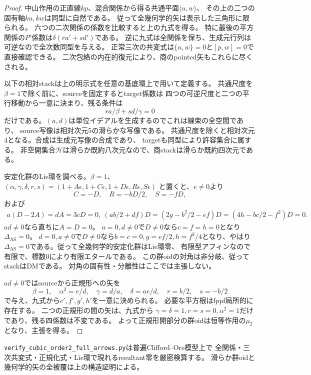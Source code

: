 \begin{proof}
中山作用の正直線$kp$、混合関係から得る共通平面$\langle u,w\rangle$、
その上の二つの固有軸$ku,kw$は同型に自然である。
従って全幾何学的矢は表示した三角形に限られる。
六つの二次関係の係数を比較すると上の九式を得る。
特に最後の平方関係の$P'$係数は$\delta(ra'+sd')$である。
逆に九式は全関係を保ち、生成元行列は可逆なので全次数同型を与える。
正常三次の共変式は$\{u,w\}=0$と$[p,w]=0$で直接確認できる。
二次包絡の内在的復元により、商のpointed矢もこれらに尽くされる。

以下の相対stackは上の明示式を任意の基底環上で用いて定義する。
共通尺度を$\beta=1$で除く前に、sourceを固定するとtarget係数は
四つの可逆尺度と二つの平行移動から一意に決まり、残る条件は
\[
 ra/\beta+sd/\gamma=0
\]
だけである。$(a,d)$は単位イデアルを生成するのでこれは線束の全空間であり、
source写像は相対次元5の滑らかな写像である。
共通尺度を除くと相対次元4となる。合成は生成元写像の合成であり、
targetも同型により許容集合に属する。
非空開集合$\mathcal H$は滑らか既約八次元なので、商stackは滑らか既約四次元である。

安定化群のLie環を調べる。$\beta=1$、
$(\alpha,\gamma,\delta,r,s)=(1+A\epsilon,1+C\epsilon,1+D\epsilon,R\epsilon,S\epsilon)$
と置くと、$e\ne0$より
\[
 C=-D,\quad R=-bD/2,\quad S=-fD,
\]
および
\begin{gather*}
 a(D-2A)=dA=3cD=0,\
 (ab/2+df)D=(2g-b^2/2-ef)D=(4h-bc/2-f^2)D=0.
\end{gather*}
$ad\ne0$なら直ちに$A=D=0$。
$a=0,d\ne0$で$D\ne0$なら$c=f=h=0$となり$\Delta_{\mathrm{AS}}=0$。
$d=0,a\ne0$で$D\ne0$なら$b=c=0,g=ef/2,h=f^2/4$となり、やはり
$\Delta_{\mathrm{AS}}=0$である。従って全幾何学的安定化群はLie環零、
有限型アフィンなので有限で、標数0により有限エタールである。
この群oidの対角は非分岐、従ってstackはDMである。
対角の固有性・分離性はここでは主張しない。

$ad\ne0$ではsourceから正規形への矢を
\[
 \beta=1,\quad\alpha^2=e/d,\quad\gamma=d/a,\quad
 \delta=ae/d,\quad r=b/2,\quad s=-b/2
\]
で与え、九式から$c',f',g',h'$を一意に決められる。
必要な平方根はfppf局所的に存在する。
二つの正規形の間の矢は、九式から
$\gamma=\delta=1,r=s=0,\alpha^2=1$だけであり、残る四係数は不変である。
よって正規形開部分の群oidは恒等作用の$\mu_2$となり、主張を得る。
\end{proof}

\texttt{verify\_cubic\_order2\_full\_arrows.py}は普遍Clifford--Ore模型上で
全関係・三次共変式・正規化式・Lie環で現れるresultant零を厳密検算する。
滑らか群oidと幾何学的矢の全被覆は上の構造証明による。


